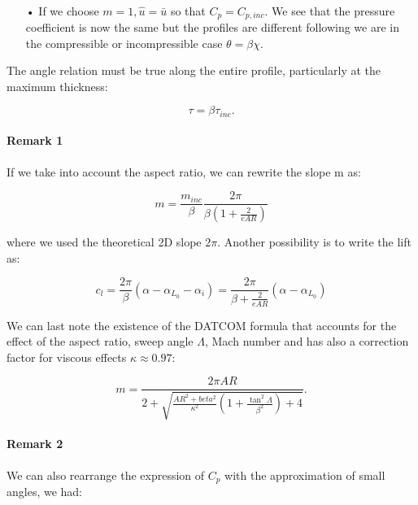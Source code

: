 	\ \\
\begin{itemize}
	\item[•] If we choose $m=1, \hat{u} = \bar{u}$ so that $C_p = C_{p, inc}$. We see that the pressure coefficient is now the same but the profiles are different following we are in the compressible or incompressible case $\theta = \beta \chi$. 
\end{itemize}

	The angle relation must be true along the entire profile, particularly at the maximum thickness: 
	
	\begin{equation}
	\tau = \beta \tau _{inc}. 
\end{equation}		
	
\paragraph{Remark 1}
	If we take into account the aspect ratio, we can rewrite the slope m as: 
	
	\begin{equation}
	m = \frac{m_{inc}}{\beta} \frac{2\pi}{\beta \left(1+\frac{2}{eAR}\right)}
\end{equation}		

	where we used the theoretical 2D slope $2\pi$. Another possibility is to write the lift as:
	
	\begin{equation}
	c_l = \frac{2\pi}{\beta} (\alpha - \alpha _{L_0} - \alpha _i) = \frac{2\pi}{\beta+\frac{2}{eAR}} (\alpha - \alpha _{L_0})
	\end{equation}

	We can	last note the existence of the DATCOM formula that accounts for the effect of the aspect ratio, sweep angle $\Lambda$, Mach number and has also a correction factor for viscous effects $\kappa \approx 0.97$: 
	
	\begin{equation}
	m = \frac{2\pi AR}{2+\sqrt{\frac{AR^2 + beta ^2}{\kappa ^2}\left( 1+\frac{\tan ^2\Lambda}{\beta ^2} \right)+4}}.
	\end{equation}
	
\paragraph{Remark 2}
	We can also rearrange the expression of $C_p$ with the approximation of small angles, we had: 
	
